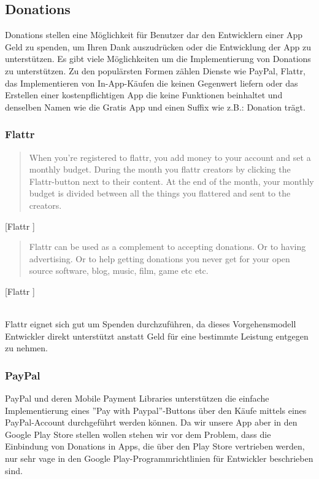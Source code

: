 \documentclass[FIPLY_base.tex]{subfiles}
\begin{document}
\subsection{Donations}
Donations stellen eine Möglichkeit für Benutzer dar den Entwicklern einer App Geld zu spenden, um Ihren Dank auszudrücken oder die Entwicklung der App zu unterstützen.
Es gibt viele Möglichkeiten um die Implementierung von Donations zu unterstützen.\newline
Zu den populärsten Formen zählen Dienste wie PayPal, Flattr, das Implementieren von In-App-Käufen die keinen Gegenwert liefern oder das Erstellen einer kostenpflichtigen App die keine Funktionen beinhaltet und denselben Namen wie die Gratis App und einen Suffix wie z.B.: Donation trägt.


\subsubsection{Flattr}
\begin{quote}
When you're registered to flattr, you add money to your account and set a monthly budget. During the month you flattr creators by clicking the Flattr-button next to their content. At the end of the month, your monthly budget is divided between all the things you flattered and sent to the creators.
\end{quote}[Flattr \cite{flattr}]

\begin{quote}
Flattr can be used as a complement to accepting donations. Or to having advertising. Or to help getting donations you never get for your open source software, blog, music, film, game etc etc.
\end{quote}[Flattr \cite{flattr}]

\ \\
Flattr eignet sich gut um Spenden durchzuführen, da dieses Vorgehensmodell Entwickler direkt unterstützt anstatt Geld für eine bestimmte Leistung entgegen zu nehmen. 

\newpage
\subsubsection{PayPal}
PayPal und deren Mobile Payment Libraries unterstützen die einfache Implementierung eines ''Pay with Paypal''-Buttons über den Käufe mittels eines PayPal-Account durchgeführt werden können.
Da wir unsere App aber in den Google Play Store stellen wollen stehen wir vor dem Problem, dass die Einbindung von Donations in Apps, die über den Play Store vertrieben werden, nur sehr vage in den Google Play-Programmrichtlinien für Entwickler beschrieben sind.
\end{document}
